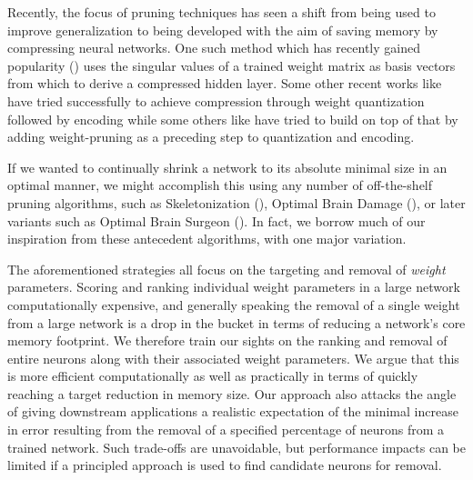 Recently, the focus of pruning techniques has seen a shift from being used to improve generalization to being developed with the aim of saving memory by compressing neural networks. One such method which has recently gained popularity (\cite{prabhavalkar2016svd}) uses the singular values of a trained weight matrix as basis vectors from which to derive a compressed hidden layer. Some other recent works like \cite{Anders2016quant} have tried successfully to achieve compression through weight quantization followed by encoding while some others like \cite{deepcompression2016} have tried to build on top of that by adding weight-pruning as a preceding step to quantization and encoding. 

If we wanted to continually shrink a network to its absolute minimal size in an optimal manner, we might accomplish this using any number of off-the-shelf pruning algorithms, such as Skeletonization (\cite{mozer1989skeletonization}), Optimal Brain Damage (\cite{lecun1989optimal}), or later variants such as Optimal Brain Surgeon (\cite{hassibi1993second}). In fact, we borrow much of our inspiration from these antecedent algorithms, with one major variation. 




The aforementioned strategies all focus on the targeting and removal of \textit{weight} parameters. Scoring and ranking individual weight parameters in a large network computationally expensive, and generally speaking the removal of a single weight from a large network is a drop in the bucket in terms of reducing a network's core memory footprint. We therefore train our sights on the ranking and removal of entire neurons along with their associated weight parameters. We argue that this is more efficient computationally as well as practically in terms of quickly reaching a target reduction in memory size. Our approach also attacks the angle of giving downstream applications a realistic expectation of the minimal increase in error resulting from the removal of a specified percentage of neurons from a trained network. Such trade-offs are unavoidable, but performance impacts can be limited if a principled approach is used to find candidate neurons for removal. 